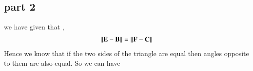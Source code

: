 \documentclass[journal,12pt,twocolumn]{IEEEtran}
\begin{document}
%
% 

 


% 
% 
% 
%   
% 
%  
%  
  
  
 
 \subsection{part 2} 
 
 we have given that ,
 \begin{align}
 	\left\lVert\mathbf{E - B}\right\rVert = \left\lVert\mathbf{F - C}\right\rVert \label{eq2.1}
 \end{align}
Hence we know that if the two sides of the triangle are equal then angles opposite to them are also equal. So we can have
\end{document}
